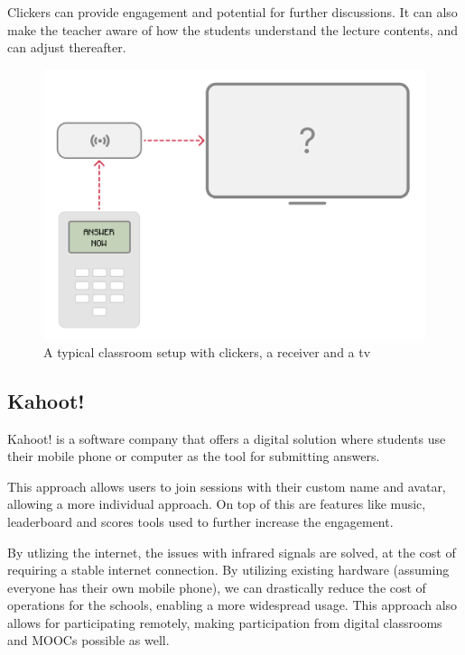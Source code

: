 Clickers can provide engagement and potential for further discussions. It can also make the teacher aware of how the students understand the lecture contents, and can adjust thereafter. 
\begin{figure}[h!]
    \centering
    \includegraphics[width=1\linewidth]{figures/clickers-illustration.png}
    \caption{A typical classroom setup with clickers, a receiver and a tv}
    \label{fig:A typical classroom setup with clickers, a receiver and a tv}
\end{figure}


\subsection{Kahoot!}
Kahoot! is a software company that offers a digital solution where students use their mobile phone or computer as the tool for submitting answers.

This approach allows users to join sessions with their custom name and avatar, allowing a more individual approach. On top of this are features like music, leaderboard and scores tools used to further increase the engagement.

By utlizing the internet, the issues with infrared signals are solved, at the cost of requiring a stable internet connection. By utilizing existing hardware (assuming everyone has their own mobile phone), we can drastically reduce the cost of operations for the schools, enabling a more widespread usage. This approach also allows for participating remotely, making participation from digital classrooms and MOOCs possible as well. 

